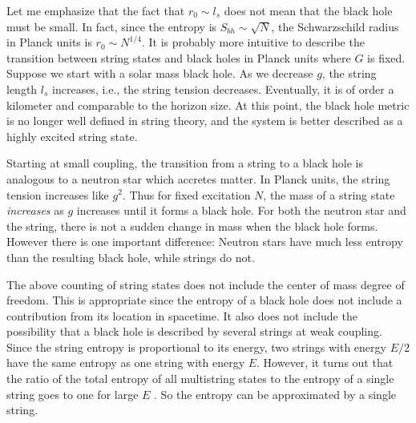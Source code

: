 \documentclass[12pt]{article}
\begin{document}
Let me emphasize that the fact that $r_0 \sim l_s$ does not mean that
the black hole must be small. In fact, since the entropy is $S_{bh} \sim
\sqrt N$, the Schwarzschild radius in Planck units is $r_0 \sim N^{1/4}$.
It is probably more intuitive to describe
the transition between  string states and black holes 
in Planck units where $G$ is fixed. Suppose we start with a solar
mass black hole. As we decrease $g$, the string length
$l_s$ increases, i.e., the string tension decreases.
Eventually, it is of order a kilometer and comparable to the horizon size.
At this point, the black hole metric is no longer well defined in
string theory, and the system is  better described as a highly
excited string state.


Starting at small coupling, the transition from a
string to a black hole is analogous to 
a neutron star which accretes matter. 
In Planck units, the string tension increases like $g^2$. Thus for fixed
excitation $N$, the mass of a string state {\it  increases} as $g$ increases
until it forms a black hole.
For both the neutron star and the string, there is not a sudden change in mass
when the black hole forms.
However there is one important difference: Neutron stars have  much less entropy
than the resulting black hole, while strings do not.

The above counting of string states does not include the center of mass
degree of
freedom. This is appropriate since the entropy of a black hole does not
include a contribution from its location in spacetime. It also does not include
the possibility that a black hole is described by several strings at
weak coupling.  Since the string entropy is proportional to its
energy, two strings with energy $E/2$ have
the same entropy as one string with energy $E$. However, it turns out
that the ratio of the total entropy of all
multistring states to the entropy of a single string goes to one for large
$E$ \cite{mitu}. So the entropy can be approximated by a single string.
\end{document}
